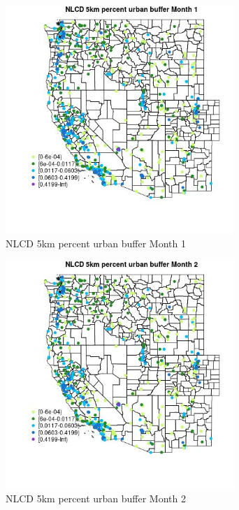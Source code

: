 \begin{figure} 
\centering  
\includegraphics[width=0.77\textwidth]{Code_Outputs/Report_ML_input_PM25_Step4_part_e_de_duplicated_aves_compiled_2019-05-14wNAs_MapObsMo1NLCD_5km_percent_urban_buffer.jpg} 
\caption{\label{fig:Report_ML_input_PM25_Step4_part_e_de_duplicated_aves_compiled_2019-05-14wNAsMapObsMo1NLCD_5km_percent_urban_buffer}NLCD 5km percent urban buffer Month 1} 
\end{figure} 
 

\begin{figure} 
\centering  
\includegraphics[width=0.77\textwidth]{Code_Outputs/Report_ML_input_PM25_Step4_part_e_de_duplicated_aves_compiled_2019-05-14wNAs_MapObsMo2NLCD_5km_percent_urban_buffer.jpg} 
\caption{\label{fig:Report_ML_input_PM25_Step4_part_e_de_duplicated_aves_compiled_2019-05-14wNAsMapObsMo2NLCD_5km_percent_urban_buffer}NLCD 5km percent urban buffer Month 2} 
\end{figure} 
 

